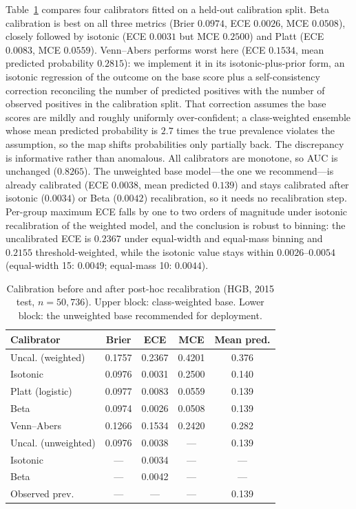 \documentclass[conference]{IEEEtran}
\begin{document}
Table~\ref{tab:cal} compares four calibrators fitted on a held-out calibration split. Beta calibration is best on all three metrics (Brier $0.0974$, ECE $0.0026$, MCE $0.0508$), closely followed by isotonic (ECE $0.0031$ but MCE $0.2500$) and Platt (ECE $0.0083$, MCE $0.0559$). Venn--Abers performs worst here (ECE $0.1534$, mean predicted probability $0.2815$): we implement it in its isotonic-plus-prior form, an isotonic regression of the outcome on the base score plus a self-consistency correction reconciling the number of predicted positives with the number of observed positives in the calibration split. That correction assumes the base scores are mildly and roughly uniformly over-confident; a class-weighted ensemble whose mean predicted probability is $2.7$ times the true prevalence violates the assumption, so the map shifts probabilities only partially back. The discrepancy is informative rather than anomalous. All calibrators are monotone, so AUC is unchanged ($0.8265$). The unweighted base model---the one we recommend---is already calibrated (ECE $0.0038$, mean predicted $0.139$) and stays calibrated after isotonic ($0.0034$) or Beta ($0.0042$) recalibration, so it needs no recalibration step. Per-group maximum ECE falls by one to two orders of magnitude under isotonic recalibration of the weighted model, and the conclusion is robust to binning: the uncalibrated ECE is $0.2367$ under equal-width and equal-mass binning and $0.2155$ threshold-weighted, while the isotonic value stays within $0.0026$--$0.0054$ (equal-width 15: $0.0049$; equal-mass 10: $0.0044$).

\begin{table}[!t]
\caption{Calibration before and after post-hoc recalibration (HGB, 2015 test, $n=50{,}736$). Upper block: class-weighted base. Lower block: the unweighted base recommended for deployment.}
\label{tab:cal}
\centering
\footnotesize
\begin{tabular}{lcccc}
\toprule
Calibrator & Brier & ECE & MCE & Mean pred. \\
\midrule
Uncal. (weighted) & 0.1757 & 0.2367 & 0.4201 & 0.376 \\
\quad Isotonic & 0.0976 & 0.0031 & 0.2500 & 0.140 \\
\quad Platt (logistic) & 0.0977 & 0.0083 & 0.0559 & 0.139 \\
\quad Beta & 0.0974 & 0.0026 & 0.0508 & 0.139 \\
\quad Venn--Abers & 0.1266 & 0.1534 & 0.2420 & 0.282 \\
\midrule
Uncal. (unweighted) & 0.0976 & 0.0038 & --- & 0.139 \\
\quad Isotonic & --- & 0.0034 & --- & --- \\
\quad Beta & --- & 0.0042 & --- & --- \\
\midrule
Observed prev. & --- & --- & --- & 0.139 \\
\bottomrule
\end{tabular}
\end{table}
\end{document}

